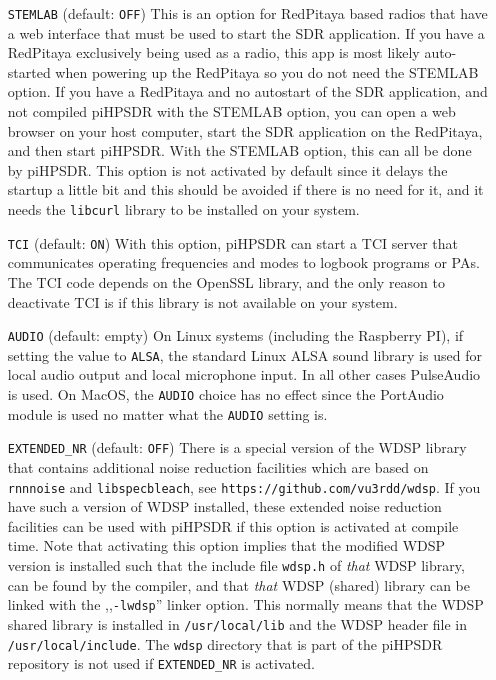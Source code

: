 \documentclass[12pt]{book}
\def\rett#1{\texttt{\color{red}#1}}
\def\pH{pi\-HPSDR\xspace}
\begin{document}
\begin{itemize}
\item[\rett{STEMLAB}] {(default: \texttt{OFF})
This is an option for RedPitaya based radios that have a web interface that must be used
to start the SDR application. If you have a RedPitaya exclusively being used as a radio, this
app is most likely auto-started when powering up the RedPitaya so you do not need the STEMLAB
option.
If you have a RedPitaya and no autostart of the SDR application, and not compiled \pH
with the STEMLAB option, you can open a web browser on your host computer, start the SDR application on the RedPitaya,
and then start \pH. With the STEMLAB option, this can all be done by \pH.
This option is not activated by default since it delays the startup a little bit  and  this should  be
avoided if  there is no need for it, and it needs the \texttt{libcurl}  library to be installed on your system.
}

\item[\rett{TCI}] {(default: \texttt{ON})
With this option,  \pH can start a TCI server that communicates operating frequencies
and modes to logbook programs or PAs. The TCI code depends on the OpenSSL library, and the only reason to
deactivate TCI is if  this library is  not available on your system.}

\item[\rett{AUDIO}] {(default: empty)
On Linux systems (including the Raspberry PI), if setting the value to \texttt{ALSA},
the standard Linux ALSA sound library is used for local audio
output and local microphone input. In all other cases
PulseAudio is used. On MacOS, the \texttt{AUDIO} choice has no effect since the PortAudio
module is used no matter what the \texttt{AUDIO} setting is.
}

\item[\rett{EXTENDED\_NR}] {(default: \texttt{OFF})
There is a special version of the WDSP library that contains additional noise
reduction facilities which are based on  \texttt{rnnnoise} and \texttt{libspecbleach}, see
 \texttt{https://github.com/vu3rdd/wdsp}. If you have such a version of WDSP installed, these
 extended noise reduction facilities can be used with \pH if this option is activated
 at compile time.
 Note that activating this option implies that the modified WDSP version is installed such
 that the include file \texttt{wdsp.h} of \textit{that}
 WDSP library, can be found by the compiler, and that \textit{that} WDSP (shared)
 library can be linked with the ,,\texttt{-lwdsp}'' linker option. This normally means
 that the WDSP shared library is installed in \texttt{/usr/local/lib} and the WDSP header file
 in \texttt{/usr/local/include}. The \texttt{wdsp} directory that is part of
 the \pH repository is not used if \texttt{EXTENDED\_NR} is activated.}



\end{itemize}
\end{document}
